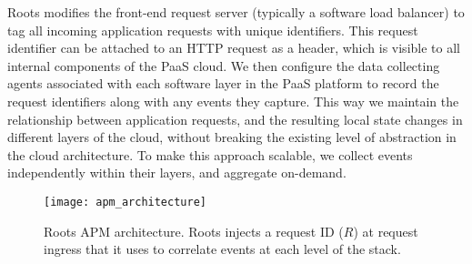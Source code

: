 Roots modifies the front-end request server (typically a software load balancer) 
to tag all incoming application requests with unique identifiers.
This request identifier can be attached to an HTTP request as a header, which is visible to all 
internal components of the PaaS cloud. We then configure the data collecting
agents associated with each software layer in the PaaS 
platform to record the request identifiers along with any events they capture. 
This way we maintain the relationship between application requests, and the resulting
local state changes in different layers of the cloud, without breaking the existing level
of abstraction in the cloud architecture. 
To make this approach scalable, we collect events independently within their layers, and 
aggregate on-demand.
%
%
\begin{figure}
\centering
\texttt{[image: apm\_architecture]}
\caption{Roots APM architecture.  Roots injects a request ID ($R$) at request
ingress that it uses to correlate events at each level of the stack.}
\label{fig:apm_architecture}
\end{figure}
%

